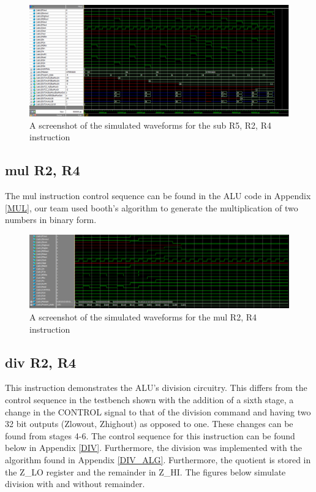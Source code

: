 \documentclass{article}
\begin{document}
    \begin{figure}[h!]
        \begin{center}
            \includegraphics[width=13cm]{SUB_final_image.png}
            \caption{A screenshot of the simulated waveforms for the sub R5, R2, R4 instruction}
        \end{center}
    \end{figure}
     
    \subsection{mul R2, R4}
    
    The mul instruction control sequence can be found in the ALU code in Appendix \ref{MUL}, our team used booth's algorithm to generate the multiplication of two numbers in binary form. 
    
    \begin{figure}[h!]
        \begin{center}
            \includegraphics[width=13cm]{mul}
            \caption{A screenshot of the simulated waveforms for the mul R2, R4 instruction}
        \end{center}
    \end{figure}

    \subsection{div R2, R4}
    
    This instruction demonstrates the ALU's division circuitry. This differs from the control sequence in the testbench shown with the addition of a sixth stage, a change in the CONTROL signal to that of the division command and having two 32 bit outputs (Zlowout, Zhighout) as opposed to one. These changes can be found from stages 4-6. The control sequence for this instruction can be found below in Appendix \ref{DIV}. Furthermore, the division was implemented with the algorithm found in Appendix \ref{DIV_ALG}. Furthermore, the quotient is stored in the Z\_LO register and the remainder in Z\_HI. The figures below simulate division with and without remainder.
    
\end{document}
